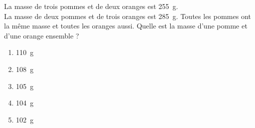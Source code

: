 La masse de trois pommes et de deux oranges est 255~g.\\La masse de deux pommes et de trois oranges est 285~g. Toutes les pommes ont la même masse et toutes les oranges aussi. Quelle est la masse d'une pomme et d'une orange ensemble ?
\begin{multicols}{5}
  \begin{enumerate}[A/]
  \item 110~g
  \item 108~g
  \item 105~g
  \item 104~g
  \item 102~g
  \end{enumerate}
\end{multicols}